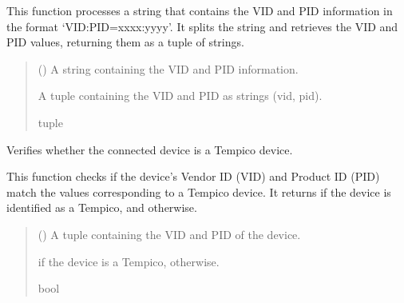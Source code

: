 \documentclass[letterpaper,10pt,english]{sphinxmanual}
\begin{document}
\begin{fulllineitems}
\begin{fulllineitems}
\sphinxAtStartPar
This function processes a string that contains the VID and PID information in the format 
‘VID:PID=xxxx:yyyy’. It splits the string and retrieves the VID and PID values, returning 
them as a tuple of strings.
\begin{quote}\begin{description}
\sphinxAtStartPar
{} () \textendash{} A string containing the VID and PID information.

\sphinxAtStartPar
A tuple containing the VID and PID as strings (vid, pid).

\sphinxAtStartPar
tuple

\end{description}\end{quote}

\end{fulllineitems}


\begin{fulllineitems}
\label{\detokenize{findDevices:findDevices.PyTempicoManager.verify_pyTempico}}
\pysigstartsignatures
{}
\pysigstopsignatures
\sphinxAtStartPar
Verifies whether the connected device is a Tempico device.

\sphinxAtStartPar
This function checks if the device’s Vendor ID (VID) and Product ID (PID) match the values 
corresponding to a Tempico device. It returns  if the device is identified as a Tempico, 
and  otherwise.
\begin{quote}\begin{description}
\sphinxAtStartPar
{} () \textendash{} A tuple containing the VID and PID of the device.

\sphinxAtStartPar
{} if the device is a Tempico,  otherwise.

\sphinxAtStartPar
bool

\end{description}\end{quote}

\end{fulllineitems}


\end{fulllineitems}
\end{document}

